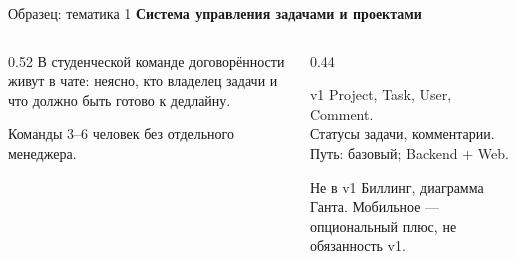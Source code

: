 \begin{frame}{Образец: тематика 1}
  \vspace{0.15em}
  {\small\textbf{Система управления задачами и проектами}}

  \vspace{0.45em}
  \begin{columns}[T]
    \begin{column}{0.52\textwidth}
      В студенческой команде договорённости живут в чате:
      неясно, кто владелец задачи и что должно быть готово к дедлайну.

      \medskip
      Команды 3--6 человек без отдельного менеджера.
    \end{column}
    \begin{column}{0.44\textwidth}
      \begin{block}{v1}
        Project, Task, User, Comment.\\
        Статусы задачи, комментарии.\\
        Путь: базовый; Backend + Web.
      \end{block}
      \begin{block}{Не в v1}
        Биллинг, диаграмма Ганта.
        Мобильное --- опциональный плюс,
        не обязанность v1.
      \end{block}
    \end{column}
  \end{columns}
\end{frame}
